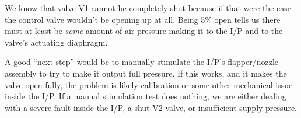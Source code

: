 We know that valve V1 cannot be completely shut because if that were the case the control valve wouldn't be opening up at all.  Being 5\% open tells us there must at least be {\it some} amount of air pressure making it to the I/P and to the valve's actuating diaphragm.

\vskip 10pt

A good ``next step'' would be to manually stimulate the I/P's flapper/nozzle assembly to try to make it output full pressure.  If this works, and it makes the valve open fully, the problem is likely calibration or some other mechanical issue inside the I/P.  If a manual stimulation test does nothing, we are either dealing with a severe fault inside the I/P, a shut V2 valve, or insufficient supply pressure.



